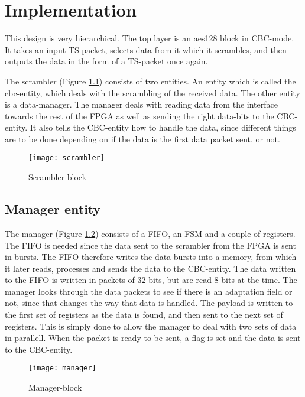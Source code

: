 \chapter{Implementation}
This design is very hierarchical. The top layer is an aes128 block in 
CBC-mode. It takes an input TS-packet, selects data from it which it 
scrambles, and then outputs the data in the form of a TS-packet once 
again.

The scrambler (Figure \ref{block:scrambler}) consists of two entities. 
An entity which is called the cbc-entity, which deals with the 
scrambling of the received data. The other entity is a data-manager. 
The manager deals with reading data from the interface towards the 
rest of the FPGA as well as sending the right data-bits to the CBC-
entity. It also tells the CBC-entity how to handle the data, since 
different things are to be done depending on if the data is the first 
data packet sent, or not.

\begin{figure}[h!]
  \centering
  \texttt{[image: scrambler]}
  \caption{Scrambler-block}
  \label{block:scrambler}
\end{figure}

\section{Manager entity}
The manager (Figure \ref{block:manager}) consists of a FIFO, an FSM 
and a couple of registers. The FIFO is needed since the data sent to 
the scrambler from the FPGA is sent in bursts. The FIFO therefore 
writes the data bursts into a memory, from which it later reads, 
processes and sends the data to the CBC-entity. The data written to 
the FIFO is written in packets of 32 bits, but are read 8 bits at the 
time. The manager looks through the data packets to see if there is 
an adaptation field or not, since that changes the way that data is 
handled. The payload is written to the first set of registers as the 
data is found, and then sent to the next set of registers. This is 
simply done to allow the manager to deal with two sets of data in 
parallell. When the packet is ready to be sent, a flag is set and the 
data is sent to the CBC-entity. 

\begin{figure}[h!]
  \centering
  \texttt{[image: manager]}
  \caption{Manager-block}
  \label{block:manager}
\end{figure}

